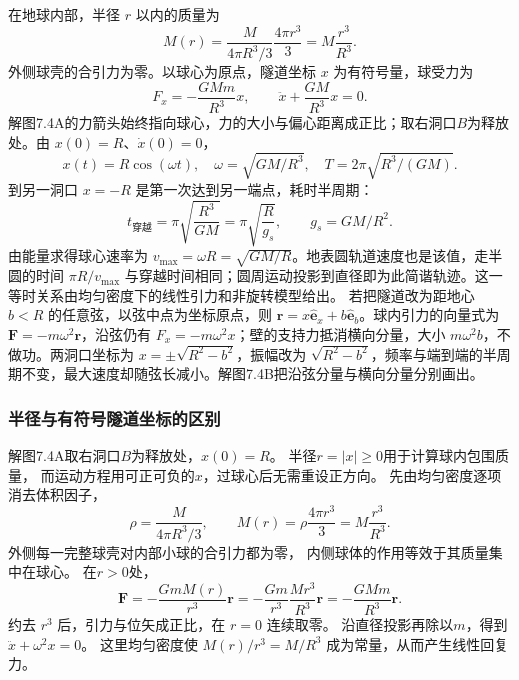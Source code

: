\documentclass[UTF8,fontset=fandol,a4paper,11pt]{ctexart}
\newcommand{\figcaption}[1]{\par\vspace{2pt}{\small\color{muted}#1}\par}
\begin{document}
\begin{center}\begin{minipage}{\linewidth}\centering{}\figcaption{解图 7.4A}\end{minipage}\end{center}
在地球内部，半径 $r$ 以内的质量为
\[M(r)=\frac{M}{4\pi R^3/3}\frac{4\pi r^3}{3}=M\frac{r^3}{R^3}.\]
外侧球壳的合引力为零。以球心为原点，隧道坐标 $x$ 为有符号量，球受力为
\[F_x=-\frac{GMm}{R^3}x,\qquad
\ddot x+\frac{GM}{R^3}x=0.\]
解图7.4A的力箭头始终指向球心，力的大小与偏心距离成正比；取右洞口$B$为释放处。由 $x(0)=R$、$\dot x(0)=0$，
\[x(t)=R\cos(\omega t),\quad\omega=\sqrt{GM/R^3},\quad
T=2\pi\sqrt{R^3/(GM)}.\]
到另一洞口 $x=-R$ 是第一次达到另一端点，耗时半周期：
\[\boxed{t_{\text{穿越}}=\pi\sqrt{\frac{R^3}{GM}}=\pi\sqrt{\frac R{g_s}},\qquad g_s=GM/R^2.}\]
由能量求得球心速率为 $v_{\max}=\omega R=\sqrt{GM/R}$。地表圆轨道速度也是该值，走半圆的时间 $\pi R/v_{\max}$ 与穿越时间相同；圆周运动投影到直径即为此简谐轨迹。这一等时关系由均匀密度下的线性引力和非旋转模型给出。
若把隧道改为距地心 $b<R$ 的任意弦，以弦中点为坐标原点，则 $\mathbf r=x\hat{\mathbf e}_x+b\hat{\mathbf e}_b$。球内引力的向量式为 $\mathbf F=-m\omega^2\mathbf r$，沿弦仍有 $F_x=-m\omega^2x$；壁的支持力抵消横向分量，大小 $m\omega^2b$，不做功。两洞口坐标为 $x=\pm\sqrt{R^2-b^2}$，振幅改为 $\sqrt{R^2-b^2}$，频率与端到端的半周期不变，最大速度却随弦长减小。解图7.4B把沿弦分量与横向分量分别画出。
\subsubsection*{半径与有符号隧道坐标的区别}
解图7.4A取右洞口$B$为释放处，$x(0)=R$。
半径$r=|x|\geq0$用于计算球内包围质量，
而运动方程用可正可负的$x$，过球心后无需重设正方向。
先由均匀密度逐项消去体积因子，
\[
\rho=\frac{M}{4\pi R^3/3},\qquad
M(r)=\rho\frac{4\pi r^3}{3}=M\frac{r^3}{R^3}.
\]
外侧每一完整球壳对内部小球的合引力都为零，
内侧球体的作用等效于其质量集中在球心。
在$r>0$处，
\[
\boldsymbol F=-\frac{GmM(r)}{r^3}\boldsymbol r
=-\frac{Gm}{r^3}\frac{Mr^3}{R^3}\boldsymbol r
=-\frac{GMm}{R^3}\boldsymbol r.
\]
约去 $r^3$ 后，引力与位矢成正比，在 $r=0$ 连续取零。
沿直径投影再除以$m$，得到$\ddot x+\omega^2x=0$。
这里均匀密度使 $M(r)/r^3=M/R^3$ 成为常量，从而产生线性回复力。
\end{document}
